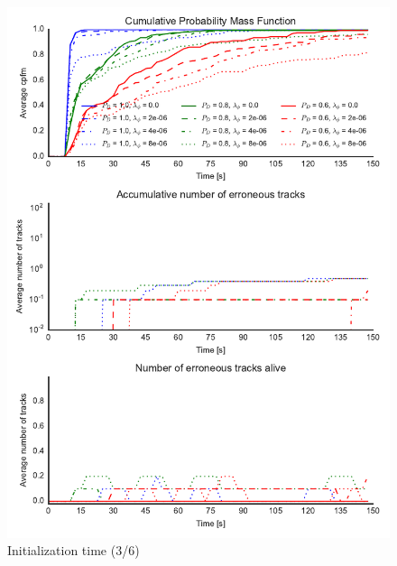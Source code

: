 \begin{figure}
\centering
\includegraphics{Figures/plots/Scenario1_Init-Time(3-6).pdf}
\caption{Initialization time (3/6)}\label{fig:init_time_3-6}
\end{figure}